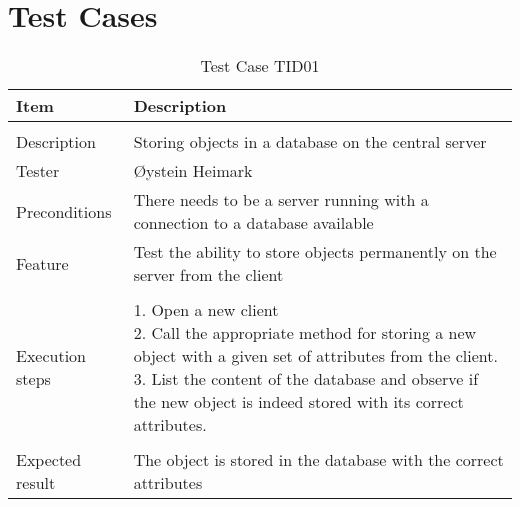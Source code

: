 \chapter{Test Cases}\label{app:test}
\begin{table}[H]
\caption{Test Case TID01}
\centering
\begin{tabular}{ l p{13cm} }
\hline
 Item            & Description                                                              \\
\hline \\ [-2.0ex]
 Description     & Storing objects in a database on the central server \\
 Tester          & Øystein Heimark                  \\
 Preconditions   & There needs to be a server running with a connection to a database available \\
 Feature         & Test the ability to store objects permanently on the server from the client  \vspace{3pt}   \\
\hline \\ [-1.5ex]
 Execution steps & \pbox{13cm}{1. Open a new client \\ 2. Call the appropriate method for storing a new object with a given set of attributes from the client. \\ 3. List the content of the database and observe if the new object is indeed stored with its correct attributes. } \vspace{3pt} \\
\hline \\ [-1.5ex]
 Expected result & The object is stored in the database with the correct attributes \\
\hline
\end{tabular}
\label{table:testcasetid01}
\end{table}
